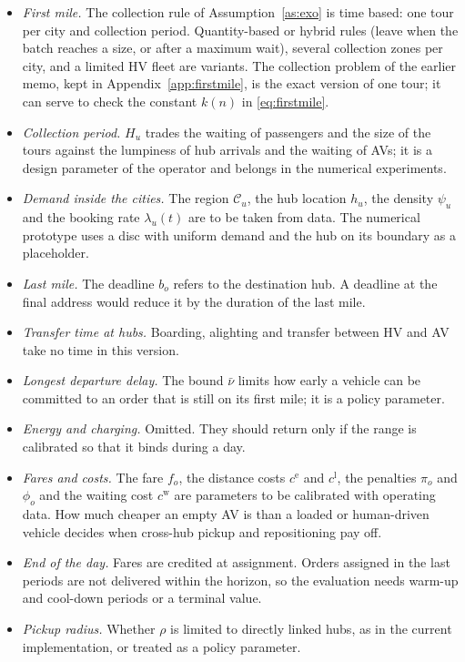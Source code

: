 \documentclass[12pt]{article}
\theoremstyle{plain}
\theoremstyle{definition}
\begin{document}
\begin{itemize}
    \item \emph{First mile.} The collection rule of Assumption~\ref{as:exo} is time based: one tour per city and collection period. Quantity-based or hybrid rules (leave when the batch reaches a size, or after a maximum wait), several collection zones per city, and a limited HV fleet are variants. The collection problem of the earlier memo, kept in Appendix~\ref{app:firstmile}, is the exact version of one tour; it can serve to check the constant $k(n)$ in \eqref{eq:firstmile}.
    \item \emph{Collection period.} $H_u$ trades the waiting of passengers and the size of the tours against the lumpiness of hub arrivals and the waiting of AVs; it is a design parameter of the operator and belongs in the numerical experiments.
    \item \emph{Demand inside the cities.} The region $\mathcal{C}_u$, the hub location $h_u$, the density $\psi_u$ and the booking rate $\lambda_u(t)$ are to be taken from data. The numerical prototype uses a disc with uniform demand and the hub on its boundary as a placeholder.
    \item \emph{Last mile.} The deadline $b_o$ refers to the destination hub. A deadline at the final address would reduce it by the duration of the last mile.
    \item \emph{Transfer time at hubs.} Boarding, alighting and transfer between HV and AV take no time in this version.
    \item \emph{Longest departure delay.} The bound $\bar\nu$ limits how early a vehicle can be committed to an order that is still on its first mile; it is a policy parameter.
    \item \emph{Energy and charging.} Omitted. They should return only if the range is calibrated so that it binds during a day.
    \item \emph{Fares and costs.} The fare $f_o$, the distance costs $c^{\mathrm{e}}$ and $c^{\mathrm{l}}$, the penalties $\pi_o$ and $\phi_o$ and the waiting cost $c^{\mathrm{w}}$ are parameters to be calibrated with operating data. How much cheaper an empty AV is than a loaded or human-driven vehicle decides when cross-hub pickup and repositioning pay off.
    \item \emph{End of the day.} Fares are credited at assignment. Orders assigned in the last periods are not delivered within the horizon, so the evaluation needs warm-up and cool-down periods or a terminal value.
    \item \emph{Pickup radius.} Whether $\rho$ is limited to directly linked hubs, as in the current implementation, or treated as a policy parameter.
\end{itemize}
\end{document}
